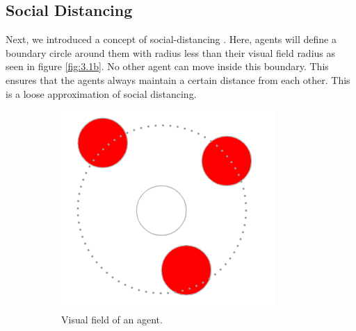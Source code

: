 \documentclass[a4paper,11pt]{article}
\begin{document}
    \subsection{Social Distancing}
    Next, we introduced a concept of social-distancing \cite{3b1b}. Here, agents will define a boundary circle around them with radius less than their visual field radius as seen in figure \ref{fig:3.1b}. No other agent can move inside this boundary. This ensures that the agents always maintain a certain distance from each other. This is a loose approximation of social distancing.

    \begin{figure}[ht]
        \centering
        \begin{subfigure}[b]{0.2\linewidth}
            \includegraphics[width=\linewidth]{diagrams/visual_field.PNG}
            \caption{Visual field of an agent.}
            \label{fig:3.1a}
        \end{subfigure}
        \begin{subfigure}[b]{0.3\linewidth}

\end{subfigure}
\end{figure}
\end{document}
